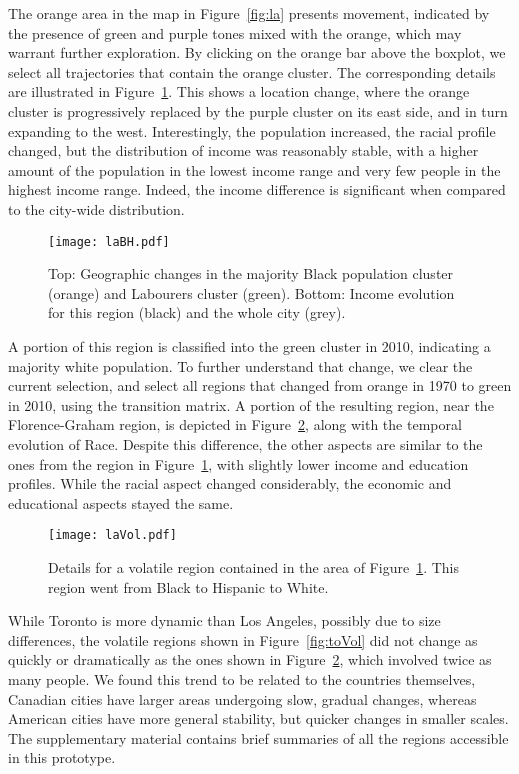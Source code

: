 The orange area in the map in Figure~\ref{fig:la} presents movement, indicated by
the presence of green and purple tones mixed with the orange, which may warrant
further exploration. By clicking on the orange bar above the boxplot, we select
all trajectories that contain the orange cluster. The corresponding details are
illustrated in Figure~\ref{fig:labh}. This shows a location change, where the
orange cluster is progressively replaced by the purple cluster on its east side,
and in turn expanding to the west. Interestingly, the population increased, the
racial profile changed, but the distribution of income was reasonably stable,
with a higher amount of the population in the lowest income range and very few
people in the highest income range. Indeed, the income  difference is
significant when compared to the city-wide distribution.

\begin{figure}
    \centering 
    \texttt{[image: laBH.pdf]}
    \caption{Top: Geographic changes in the majority Black population cluster
    (orange) and Labourers cluster (green). Bottom: Income evolution for this
    region (black) and the whole city (grey).\label{fig:labh}}
\end{figure}


A portion of this region is classified into the green cluster in 2010,
indicating a majority white population. To further understand that change, we
clear the current selection, and select all regions that changed from orange in
1970 to green in 2010, using the transition matrix. A portion of the resulting
region, near the Florence-Graham region, is depicted in Figure~\ref{fig:laVol},
along with the temporal evolution of Race. Despite this difference, the other
aspects are similar to the ones from the region in Figure~\ref{fig:labh}, with
slightly lower income and education profiles. While the racial aspect changed
considerably, the economic and educational aspects stayed the same.

\begin{figure}
    \centering 
    \texttt{[image: laVol.pdf]}
    \caption{Details for a volatile region contained in the area of
         Figure~\ref{fig:labh}. This region went from Black to Hispanic to
        White.\label{fig:laVol}}
\end{figure}



\smallskip While Toronto is more dynamic than Los Angeles, possibly due to size
differences, the volatile regions shown in Figure~\ref{fig:toVol} did not change
as quickly or dramatically as the ones shown in Figure~\ref{fig:laVol}, which
involved twice as many people. We found this trend to be related to the
countries themselves, Canadian cities have larger areas undergoing slow, gradual
changes, whereas American cities have more general stability, but quicker
changes in smaller scales. The supplementary material contains brief summaries
of all the regions accessible in this prototype.


